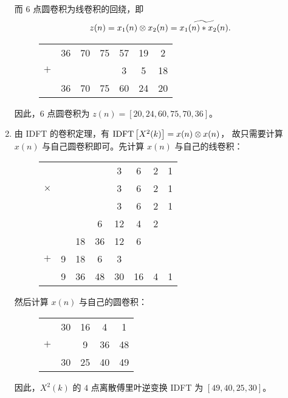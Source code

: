 \begin{solution}
\begin{enumerate}[label=(\arabic*)]
            而 $6$ 点圆卷积为线卷积的回绕，即
            \begin{align*}
                z(n) = x_1(n) \otimes x_2(n) = \widetilde{x_1(n) * x_2(n)}.
            \end{align*}
            \begin{figure}[H]
                \centering
                \begin{tabular}{c c c c c c c}
                    & 36 & 70 & 75 & 57 & 19 & 2 \\
                    $+$ & & & & 3 & 5 & 18 \\
                    \hline
                    & 36 & 70 & 75 & 60 & 24 & 20
                \end{tabular}
            \end{figure}
            因此，$6$ 点圆卷积为 $z(n) = [20, 24, 60, 75, 70, 36]$。
        \item 由 IDFT 的卷积定理，有 $\mathrm{IDFT}\left[X^2(k)\right] = x(n) \otimes x(n)$，
            故只需要计算 $x(n)$ 与自己圆卷积即可。先计算 $x(n)$ 与自己的线卷积：
            \begin{figure}[H]
                \centering
                \begin{tabular}{c c c c c c c c}
                    & & & & 3 & 6 & 2 & 1 \\
                    $\times$ & & & & 3 & 6 & 2 & 1 \\
                    \hline
                    & & & & 3 & 6 & 2 & 1 \\
                    & & & 6 & 12 & 4 & 2 \\
                    & & 18 & 36 & 12 & 6 \\
                    $+$ & 9 & 18 & 6 & 3 \\
                    \hline
                    & 9 & 36 & 48 & 30 & 16 & 4 & 1
                \end{tabular}
            \end{figure}
            然后计算 $x(n)$ 与自己的圆卷积：
            \begin{figure}[H]
                \centering
                \begin{tabular}{c c c c c}
                    & 30 & 16 & 4 & 1 \\
                    $+$ & & 9 & 36 & 48 \\
                    \hline
                    & 30 & 25 & 40 & 49
                \end{tabular}
            \end{figure}
            因此，$X^2(k)$ 的 $4$ 点离散傅里叶逆变换 IDFT 为 $[49, 40, 25, 30]$。
    \end{enumerate}
\end{solution}

